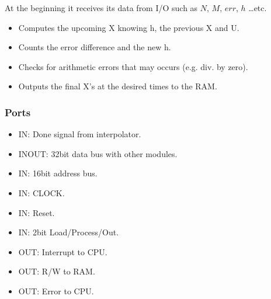 \documentclass[12pt]{report}
\begin{document}
At the beginning it receives its data from I/O such as $N$, $M$, $err$, $h$ \dots etc.

\begin{itemize}
    \item Computes the upcoming X knowing h, the previous X and U.
    \item Counts the error difference and the new h.
    \item Checks for arithmetic errors that may occurs (e.g. div. by zero).
    \item Outputs the final X's at the desired times to the RAM.
\end{itemize}

\subsubsection{Ports}
\begin{itemize}
    \item IN: Done signal from interpolator.
    \item INOUT: 32bit data bus with other modules.
    \item IN: 16bit address bus.
    \item IN: CLOCK.
    \item IN: Reset.
    \item IN: 2bit Load/Process/Out.
    \item OUT: Interrupt to CPU.
    \item OUT: R/W to RAM.
    \item OUT: Error to CPU.
\end{itemize}
\end{document}
